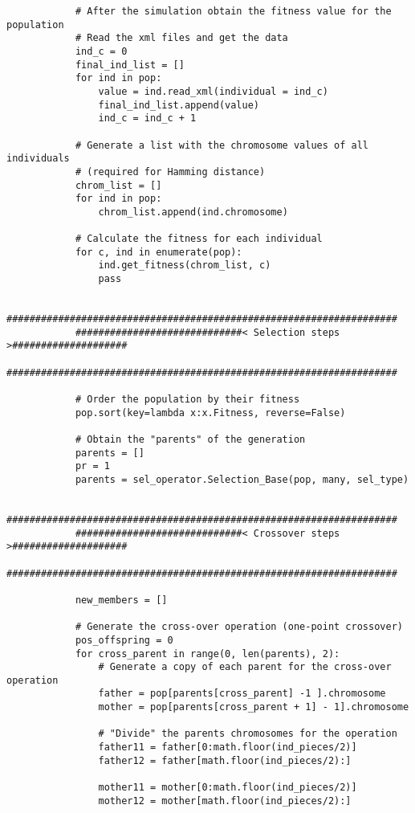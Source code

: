 \begin{verbatim}
            # After the simulation obtain the fitness value for the population
            # Read the xml files and get the data
            ind_c = 0
            final_ind_list = []
            for ind in pop:
                value = ind.read_xml(individual = ind_c)
                final_ind_list.append(value)
                ind_c = ind_c + 1

            # Generate a list with the chromosome values of all individuals 
            # (required for Hamming distance)
            chrom_list = []
            for ind in pop:
                chrom_list.append(ind.chromosome)

            # Calculate the fitness for each individual
            for c, ind in enumerate(pop):
                ind.get_fitness(chrom_list, c)
                pass

            ####################################################################
            #############################< Selection steps >####################
            ####################################################################
            
            # Order the population by their fitness
            pop.sort(key=lambda x:x.Fitness, reverse=False)

            # Obtain the "parents" of the generation
            parents = []
            pr = 1
            parents = sel_operator.Selection_Base(pop, many, sel_type)

            ####################################################################
            #############################< Crossover steps >####################
            ####################################################################
            
            new_members = []

            # Generate the cross-over operation (one-point crossover)
            pos_offspring = 0
            for cross_parent in range(0, len(parents), 2):
                # Generate a copy of each parent for the cross-over operation
                father = pop[parents[cross_parent] -1 ].chromosome
                mother = pop[parents[cross_parent + 1] - 1].chromosome
                
                # "Divide" the parents chromosomes for the operation
                father11 = father[0:math.floor(ind_pieces/2)]
                father12 = father[math.floor(ind_pieces/2):]
                
                mother11 = mother[0:math.floor(ind_pieces/2)]
                mother12 = mother[math.floor(ind_pieces/2):]
                

\end{verbatim}
